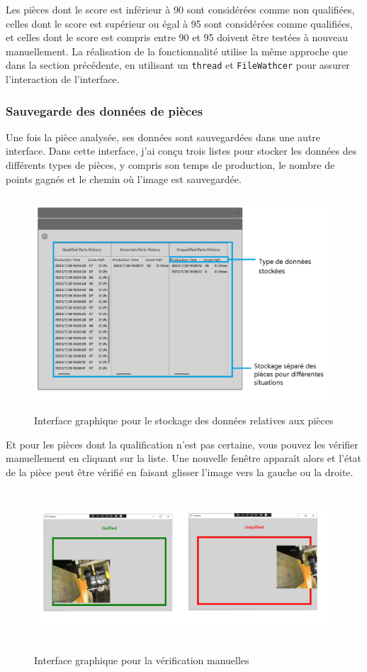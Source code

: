  Les pièces dont le score est inférieur à 90 sont considérées comme non qualifiées, celles dont le score est supérieur ou égal à 95 sont considérées comme qualifiées, et celles dont le score est compris entre 90 et 95 doivent être testées à nouveau manuellement. La réalisation de la fonctionnalité utilise la même approche que dans la section précédente, en utilisant  un \texttt{thread} et \texttt{FileWathcer} pour assurer l'interaction de l'interface.

\subsubsection{Sauvegarde des données de pièces}
Une fois la pièce analysée, ses données sont sauvegardées dans une autre interface. Dans cette interface, j'ai conçu trois listes pour stocker les données des différents types de pièces, y compris son temps de production, le nombre de points gagnés et le chemin où l'image est sauvegardée. 
\begin{figure}[H]
    \centering
    \includegraphics[height=8cm]{ressources/images/check_parts.png}
    \caption{Interface graphique pour le stockage des données relatives aux pièces }
\end{figure}

Et pour les pièces dont la qualification n'est pas certaine, vous pouvez les vérifier manuellement en cliquant sur la liste. Une nouvelle fenêtre apparaît alors et l'état de la pièce peut être vérifié en faisant glisser l'image vers la gauche ou la droite. 
\begin{figure}[H]
    \centering
    \includegraphics[height=6cm]{ressources/images/check_manuel.png}
    \caption{Interface graphique pour la vérification manuelles}
\end{figure}

